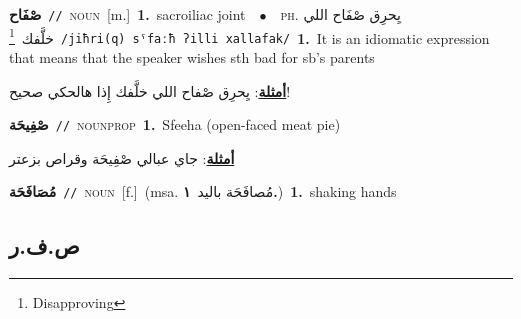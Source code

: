 \documentclass[10pt,a4paper,twoside]{article} %
\begin{document}
\begin{multicols}{2}
{\setlength\topsep{0pt}\textbf{\foreignlanguage{arabic}{صْفَاح}}\ {\color{gray}\texttt{//}\color{black}}\ \textsc{noun}\ [m.]\ \textbf{1.}~sacroiliac joint\ \ $\bullet$\ \ \textsc{ph.} \color{gray} \foreignlanguage{arabic}{يِحرِق صْفَاح اللي خلَّفك}\color{black}\ \footnote{Disapproving}\ {\color{gray}\texttt{/{\sffamily jiħri(q) sˤfaːħ ʔilli xallafak}/}\color{black}}\ \textbf{1.}~It is an idiomatic expression that means that the speaker wishes sth bad for sb's parents\  \begin{flushright}\color{gray}\foreignlanguage{arabic}{\textbf{\underline{\foreignlanguage{arabic}{أمثلة}}}: يِحرِق صْفاح اللي خلَّفك إِذا هالحكي صحيح!}\end{flushright}\color{black}} \vspace{2mm}

{\setlength\topsep{0pt}\textbf{\foreignlanguage{arabic}{صْفِيحَة}}\ {\color{gray}\texttt{//}\color{black}}\ \textsc{noun\textunderscore prop}\ \textbf{1.}~Sfeeha (open-faced meat pie)\  \begin{flushright}\color{gray}\foreignlanguage{arabic}{\textbf{\underline{\foreignlanguage{arabic}{أمثلة}}}: جاي عبالي صْفِيحَة وقراص بزعتر}\end{flushright}\color{black}} \vspace{2mm}

{\setlength\topsep{0pt}\textbf{\foreignlanguage{arabic}{مُصَافَحَة}}\ {\color{gray}\texttt{//}\color{black}}\ \textsc{noun}\ [f.]\ \color{gray}(msa. \foreignlanguage{arabic}{مُصافَحَة باليد}~\foreignlanguage{arabic}{\textbf{١.}})\color{black}\ \textbf{1.}~shaking hands\ } \vspace{2mm}

\vspace{-3mm}
\subsection*{\color{blue}\foreignlanguage{arabic}{ص.ف.ر}\color{blue}{}} 


\end{multicols}
\end{document}
